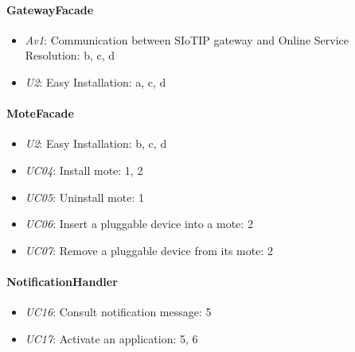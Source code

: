     \paragraph{GatewayFacade}
        \begin{itemize}
            \item \emph{Av1}: Communication between SIoTIP gateway and Online Service \\
                               Resolution: b, c, d
            \item \emph{U2}: Easy Installation: a, c, d
        \end{itemize}

    \paragraph{MoteFacade}
        \begin{itemize}
            \item \emph{U2}: Easy Installation: b, c, d
            \item \emph{UC04}: Install mote: 1, 2
            \item \emph{UC05}: Uninstall mote: 1
            \item \emph{UC06}: Insert a pluggable device into a mote: 2
            \item \emph{UC07}: Remove a pluggable device from its mote: 2
        \end{itemize}

    \paragraph{NotificationHandler}
        \begin{itemize}
            \item \emph{UC16}: Consult notification message: 5
            \item \emph{UC17}: Activate an application: 5, 6
        \end{itemize}

